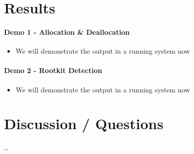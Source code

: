 \documentclass{i20lecture}
\begin{document}
\section{Results}

\begin{frame}[fragile]{\insertsection}
  \framesubtitle{Demo 1 - Allocation \& Deallocation}
    \begin{itemize}
     \item We will demonstrate the output in a running system now
     \end{itemize}
\end{frame}

\begin{frame}[fragile]{\insertsection}
  \framesubtitle{Demo 2 - Rootkit Detection}
    \begin{itemize}
     \item We will demonstrate the output in a running system now
     \end{itemize}
\end{frame}

\section{Discussion / Questions}
\begin{frame}{\insertsection}
  \begin{center}
    \LARGE \dots
  \end{center}
\end{frame}
\end{document}
